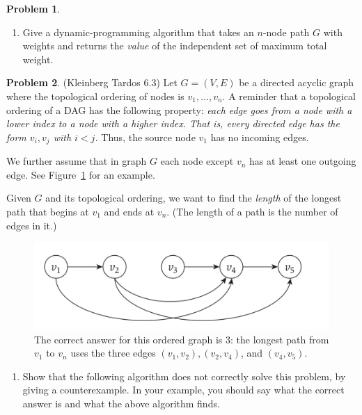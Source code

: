 \documentclass[12pt]{article}
\theoremstyle{definition}
\newtheorem{question}{Problem}
\begin{document}
\begin{question}
\begin{enumerate}[label = (\alph*)]
  \item Give a dynamic-programming algorithm that takes an $n$-node path $G$ with weights and returns the {\em value} of the independent set of maximum total weight.  
\end{enumerate}
\end{question} 





\begin{question}(Kleinberg Tardos 6.3) Let $G = (V, E)$ be a directed acyclic graph where the topological ordering
of nodes is $v_1, \ldots, v_n$.  A  reminder that a topological ordering of a DAG has the following property: {\em each edge goes from a node with a lower index to a node with a higher index. That is, every directed
edge has the form $v_i, v_j$ with $i < j$.}  Thus, the source node $v_1$ has no incoming edges.
 
We further assume that in graph $G$ each node except $v_n$ has at least one outgoing edge.
See Figure~\ref{fig:2} for an example.



Given $G$ and its topological ordering, we want to find the {\em length} of the longest path that begins
at $v_1$ and ends at $v_n$.  (The length of a path is the number of edges in it.)

\begin{figure}[h]
\centering
	\includegraphics[width=.7\linewidth]{dag.png}
	\caption{The correct answer for this ordered graph is 3: 
the longest path from $v_1$ to $v_n$ uses the three edges $(v_1, v_2),(v_2, v_4)$, and $(v_4, v_5)$.}\label{fig:2}
\end{figure}

\begin{enumerate}[label=(\alph*)]

\item Show that the following algorithm does not correctly solve this problem, by giving a counterexample. In your
example, you should say what the correct answer is and what the above algorithm finds.


\end{enumerate}
\end{question}
\end{document}
